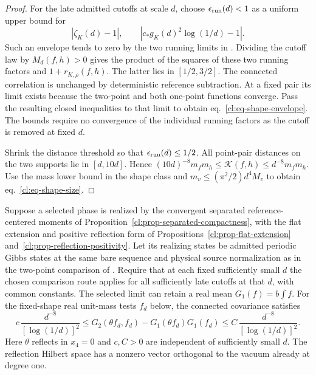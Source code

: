 \documentclass[11pt,letterpaper,reqno]{amsart}
\makeatletter
\numberwithin{equation}{section}
\renewcommand{\eqref}[1]{\textup{eq.~\ref{#1}}}
\theoremstyle{definition}
\newcommand{\ms@majorstart}{%
  \pushQED{\qed}\renewcommand{\qedsymbol}{$\blacksquare\square$}}
\newenvironment{corollary}[1][]{\ms@majorstart\ms@corollary[#1]}
  {\popQED\endms@corollary}
\theoremstyle{remark}
\makeatother
\begin{document}
\begin{proof}
For the late admitted cutoffs at scale \(d\), choose
\(\epsilon_{\rm run}(d)<1\) as a uniform upper bound for
\[
 |\zeta_K(d)-1|,\qquad
 |c_*g_K(d)^2\log(1/d)-1|.
\]
Such an envelope tends to zero by the two running limits in
\cite{FP}. Dividing the cutoff law by \(M_d(f,h)>0\)
gives the product of the squares of these two running factors
and \(1+r_{K,\rho}(f,h)\). The latter lies in \([1/2,3/2]\).
The connected correlation is unchanged by deterministic
reference subtraction. At a fixed pair its limit exists because
the two-point and both one-point functions converge.
Pass the resulting closed inequalities to that limit to obtain
\eqref{cl:eq-shape-envelope}. The bounds require no convergence
of the individual running factors as the cutoff is removed at
fixed \(d\).

Shrink the distance threshold so that
\(\epsilon_{\rm run}(d)\le1/2\). All point-pair distances on
the two supports lie in \([d,10d]\).
Hence \((10d)^{-8}m_fm_h\le\mathcal K(f,h)\le d^{-8}m_fm_h\).
Use the mass lower bound in the shape class and
\(m_v\le (\pi^2/2)d^4M_v\) to obtain
\eqref{cl:eq-shape-size}.
\end{proof}


\begin{corollary}[A nonzero scalar excitation]
\label{cl:cor-nontrivial}
Suppose a selected phase is realized by the convergent
separated reference-centered moments of
Proposition~\ref{cl:prop-separated-compactness}, with the flat
extension and positive reflection form of
Propositions~\ref{cl:prop-flat-extension}
and~\ref{cl:prop-reflection-positivity}. Let its realizing
states be admitted periodic Gibbs states
at the same bare sequence and physical source normalization
as in the two-point comparison of \cite[Theorem A and
Corollaries 6.5 and 7.1]{FP}. Require that at each fixed
sufficiently small \(d\) the chosen comparison route applies
for all sufficiently late cutoffs at that \(d\), with common
constants. The selected limit can retain a real mean
\(G_1(f)=b\int f\). For the fixed-shape real unit-mass tests
\(f_d\) below, the connected covariance satisfies
\begin{equation}
\label{cl:eq-nontrivial}
 c\,\frac{d^{-8}}{[\log(1/d)]^2}
 \le G_2(\theta f_d,f_d)-G_1(\theta f_d)G_1(f_d)
 \le C\,\frac{d^{-8}}{[\log(1/d)]^2}.
\end{equation}
Here \(\theta\) reflects in \(x_4=0\) and
\(c,C>0\) are independent of sufficiently small \(d\).
The reflection Hilbert space has a nonzero vector
orthogonal to the vacuum already at degree one.
\end{corollary}
\end{document}
